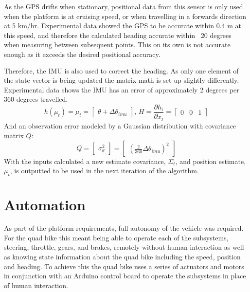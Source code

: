 \documentclass[main.tex]{subfiles}
\begin{document}
As the GPS drifts when stationary, positional data from this sensor is only used when the platform is at cruising speed, or when travelling in a forwards direction at 5 km/hr. Experimental data showed the GPS to be accurate within 0.4 m at this speed, and therefore the calculated heading accurate within ~20 degrees when measuring between subsequent points. This on its own is not accurate enough as it exceeds the desired positional accuracy.  

Therefore, the IMU is also used to correct the heading. As only one element of the state vector is being updated the matrix math is set up slightly differently. Experimental data shows the IMU has an error of approximately 2 degrees per 360 degrees travelled.
\[
h(\mu_t) = \mu_t = 
\begin{bmatrix}
    \theta + \Delta \theta_{imu}
\end{bmatrix}
\textrm{, } H = \frac{\partial h_i}{\partial x_j} = 
\begin{bmatrix}
    0	&	0	&	1
\end{bmatrix}
\]
And an observation error modeled by a Gaussian distribution with covariance matrix $Q$:
\[
Q = 
\begin{bmatrix}
    \sigma_\theta^2
\end{bmatrix}
=
\begin{bmatrix}
    (\frac{2}{360}\Delta \theta_{imu})^2
\end{bmatrix}
\]
With the inputs calculated a new estimate covariance, $\Sigma_t$, and position estimate, $\mu_t$, is outputted to be used in the next iteration of the algorithm. 

\section{Automation}

As part of the platform requirements, full autonomy of the vehicle was required. For the quad bike this meant being able to operate each of the subsystems, steering, throttle, gears, and brakes, remotely without human interaction as well as knowing state information about the quad bike including the speed, position and heading. To achieve this the quad bike uses a series of actuators and motors in conjunction with an Arduino control board to operate the subsystems in place of human interaction.
\end{document}
